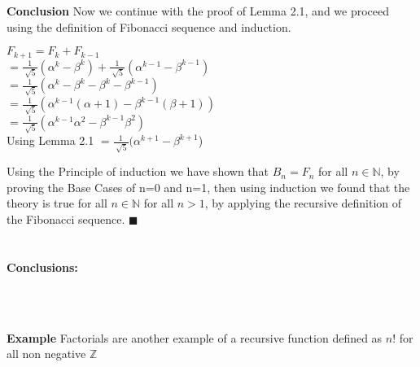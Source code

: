 \documentclass{article}
\begin{document}
{\bf Conclusion} Now we continue with the proof of Lemma 2.1, and we proceed using the definition of Fibonacci sequence and induction.
\begin{center}
	$F_{k+1}=F_{k}+F_{k-1}$
	\\
	$
	=\frac{1}{\sqrt[]{5}}(\alpha^k-\beta^k)+\frac{1}{\sqrt[]{5}}(\alpha^{k-1}-\beta^{k-1})
$
\\
$
=
\frac{1}{\sqrt[]{5}}(\alpha^k-\beta^k-\beta^k-\beta^{k-1})
$
\\
$=\frac{1}{\sqrt[]{5}}(\alpha^{k-1}(\alpha+1)-\beta^{k-1}(\beta+1))$
\\
$=\frac{1}{\sqrt[]{5}}(\alpha^{k-1}\alpha^{2}-\beta^{k-1}\beta^2)$
\\
Using Lemma 2.1
$=\frac{1}{\sqrt[]{5}}(\alpha^{k+1}-\beta^{k+1}$)
\\
\end{center}
Using the Principle of induction we have shown that $B_n=F_n$ for all $n \in {\mathbb N}$, by proving the Base Cases of n=0 and n=1, then using induction we found that the theory is true for all $n \in {\mathbb N}$ for all $n>1$, by applying the recursive definition of the Fibonacci sequence.   
$\blacksquare$
\\
~\\
~\\
{\bf Conclusions:} 
\begin{comment}While both formulas for the Fibonacci series give the same results for $n$, from the definition of computational mathematics they are very different. To find Fibonacci series recursively using $F_n$ requires $n-1$ sums or $O(n)$ time in big O notation. To computationally find the solution to $n$ using Binet's Formula would actually takes longer in cases where $n$ is a relatively small number due to the relative complexity of Binet's Formula.  However to find the Fibonacci Number for a large $n$ it is faster to use Binet's Formula. The recursive definition for the Fibonacci Sequence however is much more efficient if one wishes to find the Fibonacci Numbers in traversal order from $1$ to $n$.    
\end{comment}  
\\
\begin{comment}
	ToDo: Factorials, Other math stuff (like Catalan numbers) glanced over, Finally Computer Science implementation,Other applications: in nature Fractals
	also: recursive humor, recursive acronym: discuss recursion in languages?
\end{comment}
\\
{\bf Example} Factorials are another example of a recursive function defined as $n!$ for all non negative $\mathbb{Z}$
\end{document}
